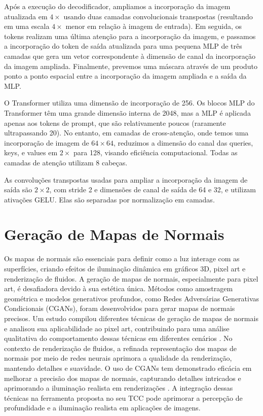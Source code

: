 Após a execução do decodificador, ampliamos a incorporação da imagem atualizada em \(4\times\) usando duas camadas convolucionais transpostas (resultando em uma escala \(4\times\) menor em relação à imagem de entrada). Em seguida, os tokens realizam uma última atenção para a incorporação da imagem, e passamos a incorporação do token de saída atualizada para uma pequena MLP de três camadas que gera um vetor correspondente à dimensão de canal da incorporação da imagem ampliada. Finalmente, prevemos uma máscara através de um produto ponto a ponto espacial entre a incorporação da imagem ampliada e a saída da MLP.

O Transformer utiliza uma dimensão de incorporação de 256. Os blocos MLP do Transformer têm uma grande dimensão interna de 2048, mas a MLP é aplicada apenas aos tokens de prompt, que são relativamente poucos (raramente ultrapassando 20). No entanto, em camadas de cross-atenção, onde temos uma incorporação de imagem de \(64 \times 64\), reduzimos a dimensão do canal das queries, keys, e values em \(2\times\) para 128, visando eficiência computacional. Todas as camadas de atenção utilizam 8 cabeças.

As convoluções transpostas usadas para ampliar a incorporação da imagem de saída são \(2 \times 2\), com stride 2 e dimensões de canal de saída de 64 e 32, e utilizam ativações GELU. Elas são separadas por normalização em camadas.


\section{Geração de Mapas de Normais}

Os mapas de normais são essenciais para definir como a luz interage com as superfícies, criando efeitos de iluminação dinâmica em gráficos 3D, pixel art e renderização de fluidos. A geração de mapas de normais, especialmente para pixel art, é desafiadora devido à sua estética única. Métodos como amostragem geométrica e modelos generativos profundos, como Redes Adversárias Generativas Condicionais (CGANs), foram desenvolvidos para gerar mapas de normais precisos. Um estudo compilou diferentes técnicas de geração de mapas de normais e analisou sua aplicabilidade ao pixel art, contribuindo para uma análise qualitativa do comportamento dessas técnicas em diferentes cenários \cite{Moreira}.
No contexto de renderização de fluidos, a refinada representação dos mapas de normais por meio de redes neurais aprimora a qualidade da renderização, mantendo detalhes e suavidade. 
O uso de CGANs tem demonstrado eficácia em melhorar a precisão dos mapas de normais, capturando detalhes intricados e aprimorando a iluminação realista em renderizações \cite{myungjin_choi__2021}. 
A integração dessas técnicas na ferramenta proposta no seu TCC pode aprimorar a percepção de profundidade e a iluminação realista em aplicações de imagens.

